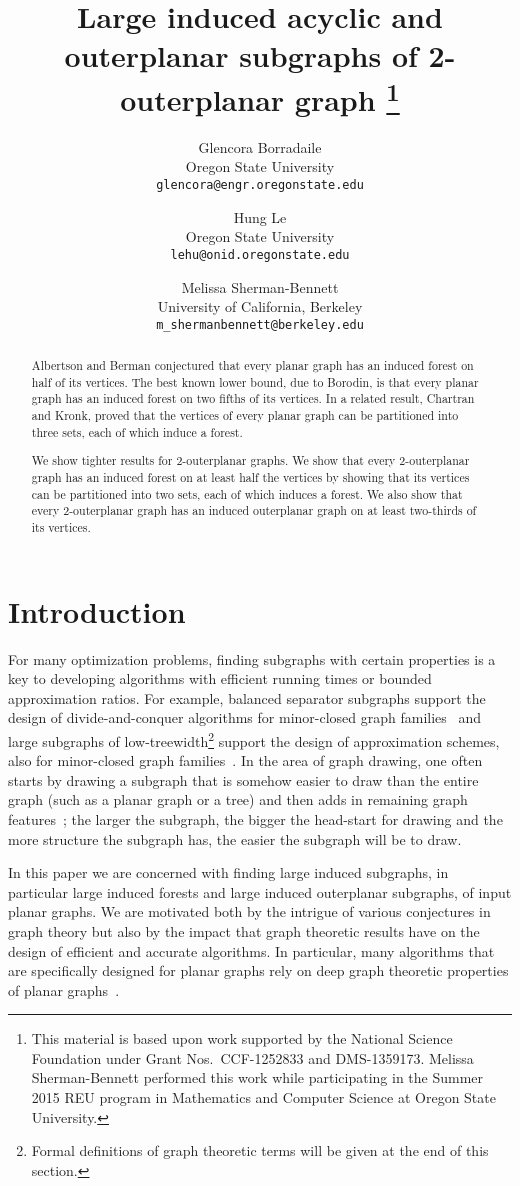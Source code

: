 \documentclass[11pt]{article}
\date{}
\title{Large induced acyclic and outerplanar subgraphs of 2-outerplanar graph \thanks{This material is based upon work supported by the National Science Foundation under Grant Nos.\ CCF-1252833 and DMS-1359173.  Melissa Sherman-Bennett performed this work while participating in the Summer 2015 REU program in Mathematics and Computer Science at Oregon State University.}}
\author{Glencora Borradaile \\Oregon State University \\ \texttt{glencora@engr.oregonstate.edu}  \and Hung Le \\Oregon State University \\ \texttt{lehu@onid.oregonstate.edu}  \and Melissa Sherman-Bennett \\University of California, Berkeley \\ \texttt{m\_shermanbennett@berkeley.edu}}
\begin{document}
\maketitle
\begin{abstract}
Albertson and Berman conjectured that every planar graph has an induced forest on half of its vertices.  The best known lower bound, due to Borodin, is that every planar graph has an induced forest on two fifths of its vertices.  In a related result, Chartran and Kronk, proved that the vertices of every planar graph can be partitioned into three sets, each of which induce a forest.

We show tighter results for 2-outerplanar graphs. We show that every 2-outerplanar graph has an induced forest on at least half the vertices by showing that its vertices can be partitioned into two sets, each of which induces a forest. We also show that every 2-outerplanar graph has an induced outerplanar graph on at least two-thirds of its vertices.  
\end{abstract}

\section{Introduction}
For many optimization problems, finding subgraphs with certain properties is a key to developing algorithms with efficient running times or bounded approximation ratios.  For example, balanced separator subgraphs support the design of divide-and-conquer algorithms for minor-closed graph families~\cite{LT79,LT80,GHT84,KR10} and large subgraphs of low-treewidth\footnote{Formal definitions of graph theoretic terms will be given at the end of this section.} support the design of approximation schemes, also for minor-closed graph families~\cite{Baker94,DHM07,Eppstein00}.  In the area of graph drawing, one often starts by drawing a subgraph that is somehow easier to draw than the entire graph (such as a planar graph or a tree) and then adds in remaining graph features~\cite{BatEadTam-98}; the larger the subgraph, the bigger the head-start for drawing and the more structure the subgraph has, the easier the subgraph will be to draw.  

In this paper we are concerned with finding large induced subgraphs, in particular large induced forests and large induced outerplanar subgraphs, of input planar graphs.  We are motivated both by the intrigue of various conjectures in graph theory but also by the impact that graph theoretic results have on the design of efficient and accurate algorithms.  In particular, many algorithms that are specifically designed for planar graphs rely on deep graph theoretic properties of planar graphs~\cite{Whitney32,Whitney33}.
\end{document}

